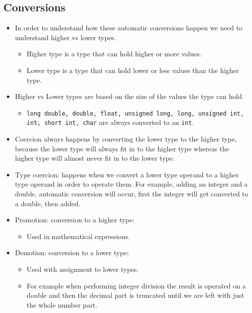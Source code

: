 \subsection{Conversions}
\begin{itemize}
    \item In order to understand how these automatic conversions happen we need to understand higher vs lower types.
        \begin{itemize}
            \item Higher type is a type that can hold higher or more values.
            \item Lower type is a type that can hold lower or less values than the higher type.
        \end{itemize}
    \item Higher vs Lower types are based on the size of the values the type can hold. 
        \begin{itemize}
            \item \texttt{long double, double, float, unsigned long, long, unsigned int, int, short int, char} are always converted to an \texttt{int}.
        \end{itemize}
    
    \item Coercion always happens by converting the lower type to the higher type, because the lower type will always fit in to the higher type whereas the higher type will almost never fit in to the lower type.
    \item Type coercion: happens when we convert a lower type operand to a higher type operand in order to operate them. For example, adding an integer and a double, automatic conversion will occur, first the integer will get converted to a double, then added.
    \item Promotion: conversion to a higher type: 
        \begin{itemize}
            \item Used in mathematical expressions.
        \end{itemize}
    
    \item Demotion: conversion to a lower type:
        \begin{itemize}
            \item Used with assignment to lower types.
            \item For example when performing integer division the result is operated on a double and then the decimal part is truncated until we are left with just the whole number part.
        \end{itemize}
\end{itemize}

